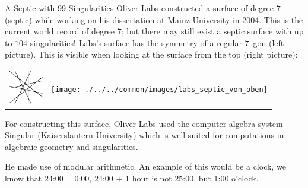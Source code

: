 \begin{surferPage}{A Septic with 99 Singularities}
    Oliver Labs constructed a surface of degree $7$ (septic) while working on his
    dissertation at Mainz University in 2004. This is the current world record
    of degree $7$; but there may still exist a septic surface with up to $104$
    singularities!  
    Labs's surface has the symmetry of a regular $7$--gon (left picture).
    This is visible when looking at the surface from the top (right picture):

    \vspace*{-0.3em}
    \begin{center}
      \begin{tabular}{c@{\qquad}c}
        \includegraphics[height=1.5cm]{./../../common/images/labsseptic1.pdf}
        &
        \texttt{[image: ./../../common/images/labs\_septic\_von\_oben]}
      \end{tabular}
    \end{center}
    \vspace*{-0.3em}

    For constructing this surface, Oliver Labs used the computer algebra system
    {\sc Singular} (Kaiserslautern University) which is well suited for
    computations in algebraic geometry and singularities.

    He made use of modular arithmetic. An example of this would be a clock, we know that 24:00$=$0:00, 24:00 $+$ 1 hour is
    not 25:00, but 1:00 o'clock.
\end{surferPage}
